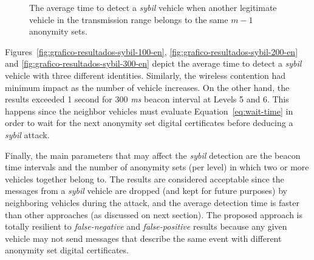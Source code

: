 \documentclass[preprint,12pt]{elsarticle}
\begin{document}
\begin{figure}[H]
\caption{\footnotesize{The average time to detect a \textit{sybil} vehicle when another legitimate vehicle in the transmission range belongs to the same $m - 1$ anonymity sets.}}
\label{fig:resultados-sybil}
\end{figure}

Figures~\ref{fig:grafico-resultados-sybil-100-en}, \ref{fig:grafico-resultados-sybil-200-en} and \ref{fig:grafico-resultados-sybil-300-en} depict the average time to detect a \textit{sybil} vehicle with three different identities. Similarly, the wireless contention had minimum impact as the number of vehicle increases. On the other hand, the results exceeded 1 second for 300 \textit{ms} beacon interval at Levels 5 and 6. This happens since the neighbor vehicles must evaluate Equation~\ref{eq:wait-time} in order to wait for the next anonymity set digital certificates before deducing a \textit{sybil} attack.

Finally, the main parameters that may affect the \textit{sybil} detection are the beacon time intervals and the number of anonymity sets (per level) in which two or more vehicles together belong to. The results are considered acceptable since the messages from a \textit{sybil} vehicle are dropped (and kept for future purposes) by neighboring vehicles during the attack, and the average detection time is faster than other approaches (as discussed on next section). The proposed approach is totally resilient to \textit{false-negative} and \textit{false-positive} results because any given vehicle may not send messages that describe the same event with different anonymity set digital certificates.


\end{document}
